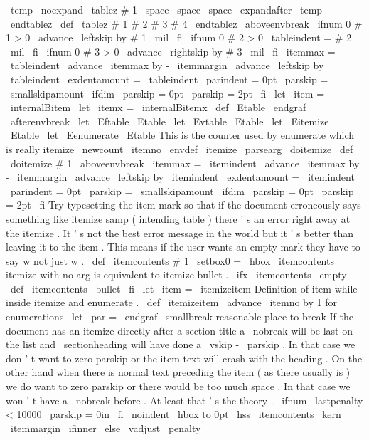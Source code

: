 {{{{{{\
temp
{
\
noexpand
\
tablez
#
1
\
space
\
space
\
space
}
%
\
expandafter
}
\
temp
\
endtablez
}
\
def
\
tablez
#
1
#
2
#
3
#
4
\
endtablez
{
%
\
aboveenvbreak
\
ifnum
0
#
1
>
0
\
advance
\
leftskip
by
#
1
\
mil
\
fi
\
ifnum
0
#
2
>
0
\
tableindent
=
#
2
\
mil
\
fi
\
ifnum
0
#
3
>
0
\
advance
\
rightskip
by
#
3
\
mil
\
fi
\
itemmax
=
\
tableindent
\
advance
\
itemmax
by
-
\
itemmargin
\
advance
\
leftskip
by
\
tableindent
\
exdentamount
=
\
tableindent
\
parindent
=
0pt
\
parskip
=
\
smallskipamount
\
ifdim
\
parskip
=
0pt
\
parskip
=
2pt
\
fi
\
let
\
item
=
\
internalBitem
\
let
\
itemx
=
\
internalBitemx
}
\
def
\
Etable
{
\
endgraf
\
afterenvbreak
}
\
let
\
Eftable
\
Etable
\
let
\
Evtable
\
Etable
\
let
\
Eitemize
\
Etable
\
let
\
Eenumerate
\
Etable
%
This
is
the
counter
used
by
enumerate
which
is
really
itemize
\
newcount
\
itemno
\
envdef
\
itemize
{
\
parsearg
\
doitemize
}
\
def
\
doitemize
#
1
{
%
\
aboveenvbreak
\
itemmax
=
\
itemindent
\
advance
\
itemmax
by
-
\
itemmargin
\
advance
\
leftskip
by
\
itemindent
\
exdentamount
=
\
itemindent
\
parindent
=
0pt
\
parskip
=
\
smallskipamount
\
ifdim
\
parskip
=
0pt
\
parskip
=
2pt
\
fi
%
%
Try
typesetting
the
item
mark
so
that
if
the
document
erroneously
says
%
something
like
itemize
samp
(
intending
table
)
there
'
s
an
error
%
right
away
at
the
itemize
.
It
'
s
not
the
best
error
message
in
the
%
world
but
it
'
s
better
than
leaving
it
to
the
item
.
This
means
if
%
the
user
wants
an
empty
mark
they
have
to
say
w
{
}
not
just
w
.
\
def
\
itemcontents
{
#
1
}
%
\
setbox0
=
\
hbox
{
\
itemcontents
}
%
%
%
itemize
with
no
arg
is
equivalent
to
itemize
bullet
.
\
ifx
\
itemcontents
\
empty
\
def
\
itemcontents
{
\
bullet
}
\
fi
%
\
let
\
item
=
\
itemizeitem
}
%
Definition
of
item
while
inside
itemize
and
enumerate
.
%
\
def
\
itemizeitem
{
%
\
advance
\
itemno
by
1
%
for
enumerations
{
\
let
\
par
=
\
endgraf
\
smallbreak
}
%
reasonable
place
to
break
{
%
%
If
the
document
has
an
itemize
directly
after
a
section
title
a
%
\
nobreak
will
be
last
on
the
list
and
\
sectionheading
will
have
%
done
a
\
vskip
-
\
parskip
.
In
that
case
we
don
'
t
want
to
zero
%
parskip
or
the
item
text
will
crash
with
the
heading
.
On
the
%
other
hand
when
there
is
normal
text
preceding
the
item
(
as
there
%
usually
is
)
we
do
want
to
zero
parskip
or
there
would
be
too
much
%
space
.
In
that
case
we
won
'
t
have
a
\
nobreak
before
.
At
least
%
that
'
s
the
theory
.
\
ifnum
\
lastpenalty
<
10000
\
parskip
=
0in
\
fi
\
noindent
\
hbox
to
0pt
{
\
hss
\
itemcontents
\
kern
\
itemmargin
}
%
%
\
ifinner
\
else
\
vadjust
{
\
penalty
}}}}}}}
